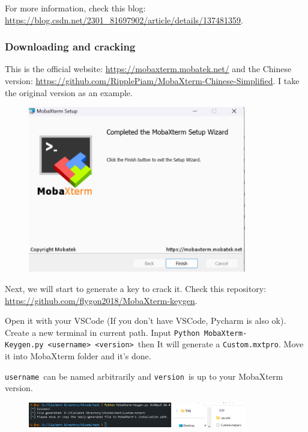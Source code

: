 \documentclass[12pt]{ctexart}
\begin{document}
For more information, check this blog:
\href{https://blog.csdn.net/2301\_81697902/article/details/137481359}{https://blog.csdn.net/2301\_81697902/article/details/137481359}.

\subsubsection{\textbf{Downloading and cracking}}

This is the official website: \href{https://mobaxterm.mobatek.net/}{https://mobaxterm.mobatek.net/} and
the Chinese version:
\url{https://github.com/RipplePiam/MobaXterm-Chinese-Simplified}. I take
the original version as an example.

\begin{figure}[H]
    \centering
    \includegraphics[width=0.85\textwidth,keepaspectratio]{assets/Linux/2.2 MobaXterm, go ssh it!/1.png}
\end{figure}

Next, we will start to generate a key to crack it. Check this
repository: \url{https://github.com/flygon2018/MobaXterm-keygen}.

Open it with your VSCode (If you don't have VSCode,
Pycharm is also ok). Create a new terminal in current path. Input
\texttt{Python\ MobaXterm-Keygen.py\ \textless{}username\textgreater{}\ \textless{}version\textgreater{}}\
then It will generate a \texttt{Custom.mxtpro}. Move it into MobaXterm
folder and it's done.

\texttt{username}\ can be named arbitrarily and \texttt{version}\ is up to
your MobaXterm version.

\begin{figure}[H]
    \centering
    \includegraphics[width=0.85\textwidth,keepaspectratio]{assets/Linux/2.2 MobaXterm, go ssh it!/2.png}
\end{figure}
\end{document}
